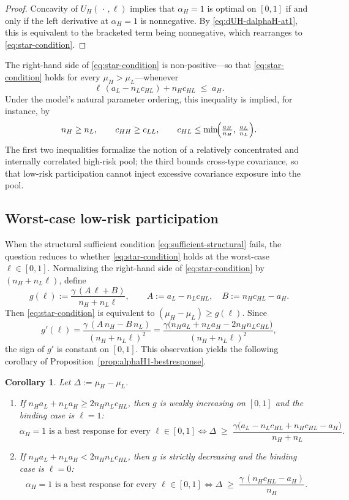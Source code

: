 \documentclass[a4paper,12pt]{article}
\newtheorem{corollary}[theorem]{Corollary}
\theoremstyle{definition}
\theoremstyle{remark}
\newcommand{\1}{\mathbf{1}}
\begin{document}
\begin{proof}
Concavity of \(U_H(\,\cdot\,,\ell)\) implies that \(\alpha_H=1\) is optimal on
\([0,1]\) if and only if the left derivative at \(\alpha_H=1\) is nonnegative.
By \eqref{eq:dUH-dalphaH-at1}, this is equivalent to the bracketed term being
nonnegative, which rearranges to \eqref{eq:star-condition}.
\end{proof}

The right-hand side of \eqref{eq:star-condition} is non-positive---so that
\eqref{eq:star-condition} holds for every \(\mu_H>\mu_L\)---whenever
\begin{equation}\label{eq:sufficient-structural}
\ell\,(a_L-n_L c_{HL})+n_H c_{HL}\;\le\;a_H.
\end{equation}
Under the model's natural parameter ordering, this inequality is implied, for
instance, by
\[
n_H\ge n_L,\qquad
c_{HH}\ge c_{LL},\qquad
c_{HL}\le \min\!\Bigl(\tfrac{a_H}{n_H},\,\tfrac{a_L}{n_L}\Bigr).
\]
The first two inequalities formalize the notion of a relatively concentrated
and internally correlated high-risk pool; the third bounds cross-type
covariance, so that low-risk participation cannot inject excessive covariance
exposure into the pool.

\subsection{Worst-case low-risk participation}\label{sec:worstcase-ell}

When the structural sufficient condition \eqref{eq:sufficient-structural}
fails, the question reduces to whether \eqref{eq:star-condition} holds at the
worst-case \(\ell\in[0,1]\). Normalizing the right-hand side of
\eqref{eq:star-condition} by \((n_H+n_L\ell)\), define
\[
g(\ell)
:=
\frac{\gamma\,(A\,\ell+B)}{n_H+n_L\ell},
\qquad
A:=a_L-n_L c_{HL},
\quad
B:=n_H c_{HL}-a_H.
\]
Then \eqref{eq:star-condition} is equivalent to
\((\mu_H-\mu_L)\ge g(\ell)\). Since
\[
g'(\ell)
=\frac{\gamma\,(A\,n_H-B\,n_L)}{(n_H+n_L\ell)^{2}}
=\frac{\gamma\bigl(n_H a_L+n_L a_H-2 n_H n_L c_{HL}\bigr)}
{(n_H+n_L\ell)^{2}},
\]
the sign of \(g'\) is constant on \([0,1]\). This observation yields the following corollary of Proposition~\ref{prop:alphaH1-bestresponse}.

\begin{corollary}\label{cor:worst-ell}
Let \(\Delta:=\mu_H-\mu_L\).
\begin{enumerate}[leftmargin=2em,label=(\roman*)]
\item If \(n_H a_L+n_L a_H\ge 2n_Hn_L c_{HL}\), then \(g\) is weakly
increasing on \([0,1]\) and the binding case is \(\ell=1\):
\[
\alpha_H=1\text{ is a best response for every }\ell\in[0,1]
\iff
\Delta\;\ge\;\frac{\gamma\bigl(a_L-n_L c_{HL}+n_Hc_{HL}-a_H\bigr)}{n_H+n_L}.
\]
\item If \(n_H a_L+n_L a_H< 2n_Hn_L c_{HL}\), then \(g\) is strictly
decreasing and the binding case is \(\ell=0\):
\[
\alpha_H=1\text{ is a best response for every }\ell\in[0,1]
\iff
\Delta\;\ge\;\frac{\gamma\,(n_Hc_{HL}-a_H)}{n_H}.
\]
\end{enumerate}
\end{corollary}
\end{document}
